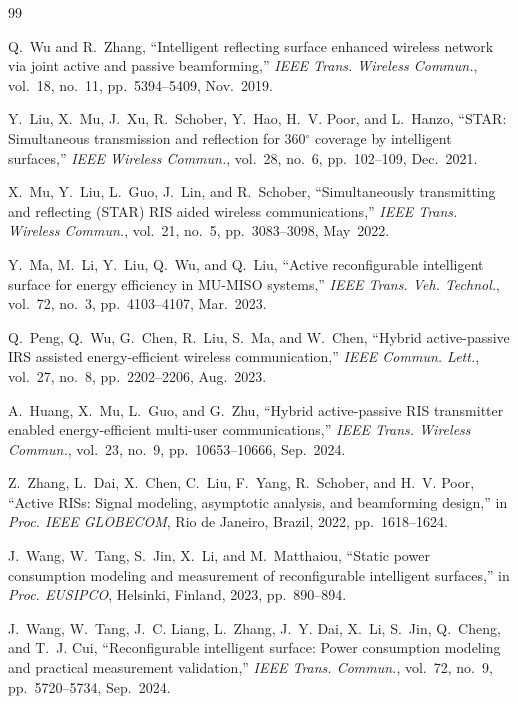 \documentclass[journal]{IEEEtran}
\begin{document}
\begingroup
\renewcommand{\baselinestretch}{0.70}\selectfont
\fontsize{5.2}{5.2}\selectfont
\begin{thebibliography}{99}
\setlength{\itemsep}{0pt}
\setlength{\parskip}{0pt}


Q.~Wu and R.~Zhang,
``Intelligent reflecting surface enhanced wireless network via joint active and passive beamforming,''
\emph{IEEE Trans. Wireless Commun.}, vol.~18, no.~11, pp.~5394--5409, Nov.~2019.


Y.~Liu, X.~Mu, J.~Xu, R.~Schober, Y.~Hao, H.~V. Poor, and L.~Hanzo,
``STAR: Simultaneous transmission and reflection for 360$^\circ$ coverage by intelligent surfaces,''
\emph{IEEE Wireless Commun.}, vol.~28, no.~6, pp.~102--109, Dec.~2021.

X.~Mu, Y.~Liu, L.~Guo, J.~Lin, and R.~Schober,
``Simultaneously transmitting and reflecting (STAR) RIS aided wireless communications,''
\emph{IEEE Trans. Wireless Commun.}, vol.~21, no.~5, pp.~3083--3098, May~2022.

Y.~Ma, M.~Li, Y.~Liu, Q.~Wu, and Q.~Liu,
``Active reconfigurable intelligent surface for energy efficiency in MU-MISO systems,''
\emph{IEEE Trans. Veh. Technol.}, vol.~72, no.~3, pp.~4103--4107, Mar.~2023.

Q.~Peng, Q.~Wu, G.~Chen, R.~Liu, S.~Ma, and W.~Chen,
``Hybrid active-passive IRS assisted energy-efficient wireless communication,''
\emph{IEEE Commun. Lett.}, vol.~27, no.~8, pp.~2202--2206, Aug.~2023.

A.~Huang, X.~Mu, L.~Guo, and G.~Zhu,
``Hybrid active-passive RIS transmitter enabled energy-efficient multi-user communications,''
\emph{IEEE Trans. Wireless Commun.}, vol.~23, no.~9, pp.~10653--10666, Sep.~2024.

Z.~Zhang, L.~Dai, X.~Chen, C.~Liu, F.~Yang, R.~Schober, and H.~V. Poor,
``Active RISs: Signal modeling, asymptotic analysis, and beamforming design,''
in \emph{Proc. IEEE GLOBECOM}, Rio de Janeiro, Brazil, 2022, pp.~1618--1624.

J.~Wang, W.~Tang, S.~Jin, X.~Li, and M.~Matthaiou,
``Static power consumption modeling and measurement of reconfigurable intelligent surfaces,''
in \emph{Proc. EUSIPCO}, Helsinki, Finland, 2023, pp.~890--894.

J.~Wang, W.~Tang, J.~C. Liang, L.~Zhang, J.~Y. Dai, X.~Li, S.~Jin, Q.~Cheng, and T.~J. Cui,
``Reconfigurable intelligent surface: Power consumption modeling and practical measurement validation,''
\emph{IEEE Trans. Commun.}, vol.~72, no.~9, pp.~5720--5734, Sep.~2024.



\end{thebibliography}
\end{document}
